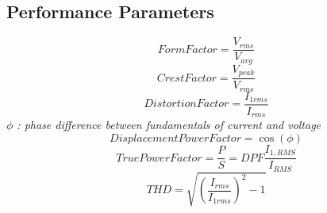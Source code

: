 \documentclass[twocolumn, ]{article}
\begin{document}
\subsection{\small Performance Parameters}
\begin{equation}
Form Factor=\frac{V_{rms}}{V_{avg}}
\end{equation}
\begin{equation}
Crest Factor=\frac{V_{peak}}{V_{rms}}
\end{equation}
\begin{equation}
Distortion Factor=\frac{I_{1rms}}{I_{rms}}
\end{equation}
\textit{$\phi$ : phase difference between fundamentals of current and voltage}
\begin{equation}
Displacement Power Factor=\cos(\phi)
\end{equation}
\begin{equation}
True Power Factor=\frac{P}{S}=DPF \frac{I_{1,RMS}}{I_{RMS}}
\end{equation}
\begin{equation}
THD=\sqrt{(\frac{I_{rms}}{I_{1rms}})^2-1}
\end{equation}
\end{document}
